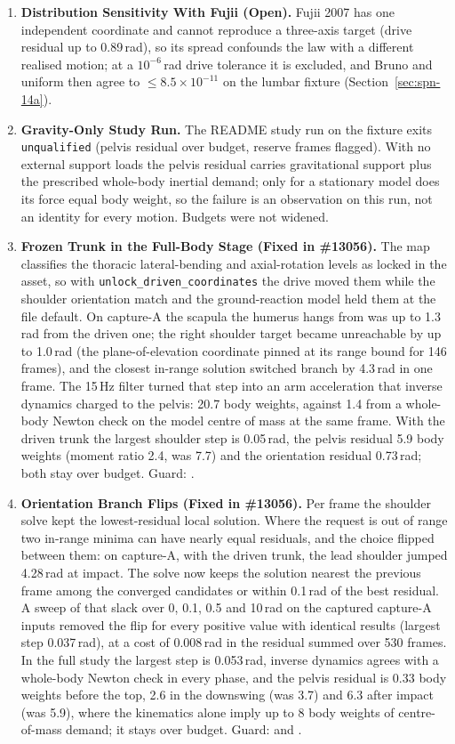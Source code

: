 \documentclass[11pt,a4paper]{article}
\begin{document}
\begin{enumerate}
  \item \textbf{Distribution Sensitivity With Fujii (Open).} Fujii 2007 has one independent coordinate and cannot reproduce a three-axis target (drive residual up to 0.89\,rad), so its spread confounds the law with a different realised motion; at a $10^{-6}$\,rad drive tolerance it is excluded, and Bruno and uniform then agree to $\le 8.5\times10^{-11}$ on the lumbar fixture (Section~\ref{sec:spn-14a}).
  \item \textbf{Gravity-Only Study Run.} The README study run on the fixture exits \texttt{unqualified} (pelvis residual over budget, reserve frames flagged). With no external support loads the pelvis residual carries gravitational support plus the prescribed whole-body inertial demand; only for a stationary model does its force equal body weight, so the failure is an observation on this run, not an identity for every motion. Budgets were not widened.
  \item \textbf{Frozen Trunk in the Full-Body Stage (Fixed in \#13056).} The map classifies the thoracic lateral-bending and axial-rotation levels as locked in the asset, so with \texttt{unlock\_driven\_coordinates} the drive moved them while the shoulder orientation match and the ground-reaction model held them at the file default. On capture-A the scapula the humerus hangs from was up to 1.3\,rad from the driven one; the right shoulder target became unreachable by up to 1.0\,rad (the plane-of-elevation coordinate pinned at its range bound for 146 frames), and the closest in-range solution switched branch by 4.3\,rad in one frame. The 15\,Hz filter turned that step into an arm acceleration that inverse dynamics charged to the pelvis: 20.7 body weights, against 1.4 from a whole-body Newton check on the model centre of mass at the same frame. With the driven trunk the largest shoulder step is 0.05\,rad, the pelvis residual 5.9 body weights (moment ratio 2.4, was 7.7) and the orientation residual 0.73\,rad; both stay over budget. Guard: .
  \item \textbf{Orientation Branch Flips (Fixed in \#13056).} Per frame the shoulder solve kept the lowest-residual local solution. Where the request is out of range two in-range minima can have nearly equal residuals, and the choice flipped between them: on capture-A, with the driven trunk, the lead shoulder jumped 4.28\,rad at impact. The solve now keeps the solution nearest the previous frame among the converged candidates or within 0.1\,rad of the best residual. A sweep of that slack over 0, 0.1, 0.5 and 10\,rad on the captured capture-A inputs removed the flip for every positive value with identical results (largest step 0.037\,rad), at a cost of 0.008\,rad in the residual summed over 530 frames. In the full study the largest step is 0.053\,rad, inverse dynamics agrees with a whole-body Newton check in every phase, and the pelvis residual is 0.33 body weights before the top, 2.6 in the downswing (was 3.7) and 6.3 after impact (was 5.9), where the kinematics alone imply up to 8 body weights of centre-of-mass demand; it stays over budget. Guard:  and .

\end{enumerate}
\end{document}
